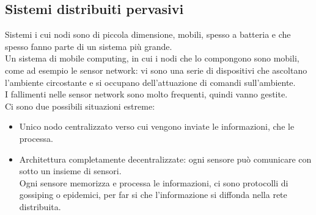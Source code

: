\documentclass[16px]{article}
\begin{document}
\subsection{Sistemi distribuiti pervasivi}
Sistemi i cui nodi sono di piccola dimensione, mobili, spesso a batteria e che spesso fanno parte di un sistema più grande.\\ Un sistema di mobile computing, in cui i nodi che lo compongono sono mobili, come ad esempio le sensor network:  vi sono una serie di dispositivi che ascoltano l'ambiente circostante e si occupano dell'attuazione di comandi sull'ambiente.\\ I fallimenti nelle sensor network sono molto frequenti, quindi vanno gestite.\\ Ci sono due possibili situazioni estreme:
\begin{itemize}
\item Unico nodo centralizzato verso cui vengono inviate le informazioni, che le processa.
\item Architettura completamente decentralizzate: ogni sensore può comunicare con sotto un insieme di sensori. \\Ogni sensore memorizza e processa le informazioni, ci sono protocolli di gossiping o epidemici, per far si che l'informazione si diffonda nella rete distribuita.
\end{itemize}
\end{document}
